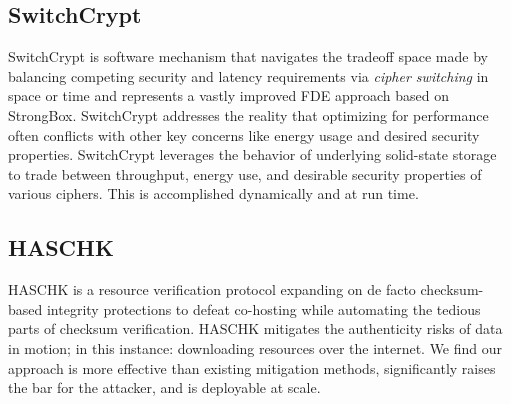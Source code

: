 \subsection{SwitchCrypt}

SwitchCrypt is software mechanism that navigates the tradeoff space made by
balancing competing security and latency requirements via \emph{cipher
switching} in space or time and represents a vastly improved FDE approach based
on StrongBox. SwitchCrypt addresses the reality that optimizing for performance
often conflicts with other key concerns like energy usage and desired security
properties. SwitchCrypt leverages the behavior of underlying solid-state storage
to trade between throughput, energy use, and desirable security properties of
various ciphers. This is accomplished dynamically and at run time.

\subsection{HASCHK}

HASCHK is a resource verification protocol expanding on de facto checksum-based
integrity protections to defeat co-hosting while automating the tedious parts of
checksum verification. HASCHK mitigates the authenticity risks of data in
motion; in this instance: downloading resources over the internet. We find our
approach is more effective than existing mitigation methods, significantly
raises the bar for the attacker, and is deployable at scale.
